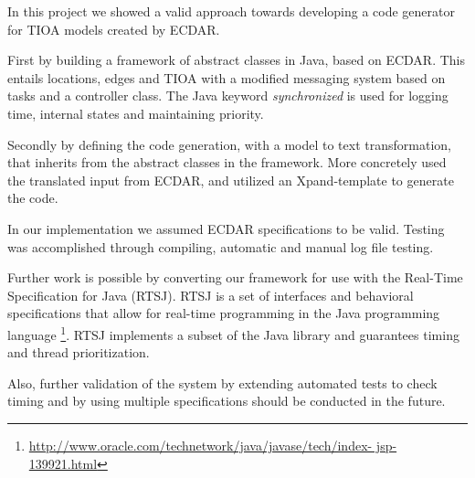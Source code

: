 In this project we showed a valid approach towards developing a code 
generator for TIOA models created by ECDAR. 

First by building a framework of abstract classes in Java, based on 
ECDAR. This entails locations, edges and TIOA with a modified messaging 
system based on tasks and a controller class. The Java keyword 
\textit{synchronized} is used for logging time, internal states and 
maintaining priority. 

Secondly by defining the code generation, with a model to text 
transformation, that inherits from the abstract classes in the 
framework. More concretely used the translated input from ECDAR, and 
utilized an Xpand-template to generate the code. 

In our implementation we assumed ECDAR specifications to be valid. 
Testing was accomplished through compiling, automatic and manual log 
file testing. 

Further work is possible by converting our framework for use with the 
Real-Time Specification for Java (RTSJ). RTSJ is a set of interfaces and 
behavioral specifications that allow for real-time programming in the 
Java programming language 
\footnote{\url{http://www.oracle.com/technetwork/java/javase/tech/index- 
jsp-139921.html}}. RTSJ implements a subset of the Java library and guarantees
timing and thread prioritization.

Also, further validation of the system by extending automated tests to check
timing and by using multiple specifications should be conducted in the future.

